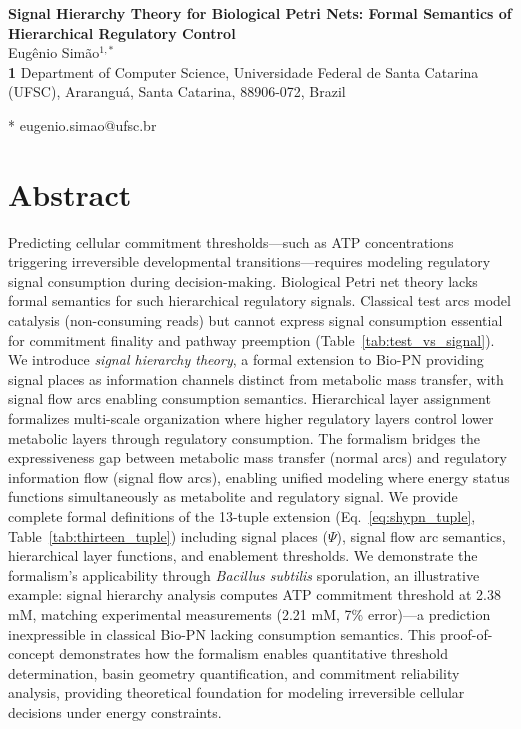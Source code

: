 \documentclass[10pt,letterpaper]{article}
\begin{document}
\vspace*{0.2in}

\begin{flushleft}
{\Large
\textbf{Signal Hierarchy Theory for Biological Petri Nets: Formal Semantics of Hierarchical Regulatory Control}
}
\newline
\\
Eug\^enio Sim\~ao$^{1,*}$
\\
\bigskip
\textbf{1} Department of Computer Science, Universidade Federal de Santa Catarina (UFSC), Ararangu\'a, Santa Catarina, 88906-072, Brazil
\\
\bigskip

* eugenio.simao@ufsc.br

\end{flushleft}

\section*{Abstract}
Predicting cellular commitment thresholds---such as ATP concentrations triggering irreversible developmental transitions---requires modeling regulatory signal consumption during decision-making. Biological Petri net theory lacks formal semantics for such hierarchical regulatory signals. Classical test arcs model catalysis (non-consuming reads) but cannot express signal consumption essential for commitment finality and pathway preemption (Table~\ref{tab:test_vs_signal}). We introduce \textit{signal hierarchy theory}, a formal extension to Bio-PN providing signal places as information channels distinct from metabolic mass transfer, with signal flow arcs enabling consumption semantics. Hierarchical layer assignment formalizes multi-scale organization where higher regulatory layers control lower metabolic layers through regulatory consumption. The formalism bridges the expressiveness gap between metabolic mass transfer (normal arcs) and regulatory information flow (signal flow arcs), enabling unified modeling where energy status functions simultaneously as metabolite and regulatory signal. We provide complete formal definitions of the 13-tuple extension (Eq.~\ref{eq:shypn_tuple}, Table~\ref{tab:thirteen_tuple}) including signal places ($\Psi$), signal flow arc semantics, hierarchical layer functions, and enablement thresholds. We demonstrate the formalism's applicability through \textit{Bacillus subtilis} sporulation, an illustrative example: signal hierarchy analysis computes ATP commitment threshold at 2.38 mM, matching experimental measurements (2.21 mM, 7\% error)---a prediction inexpressible in classical Bio-PN lacking consumption semantics. This proof-of-concept demonstrates how the formalism enables quantitative threshold determination, basin geometry quantification, and commitment reliability analysis, providing theoretical foundation for modeling irreversible cellular decisions under energy constraints.
\end{document}
